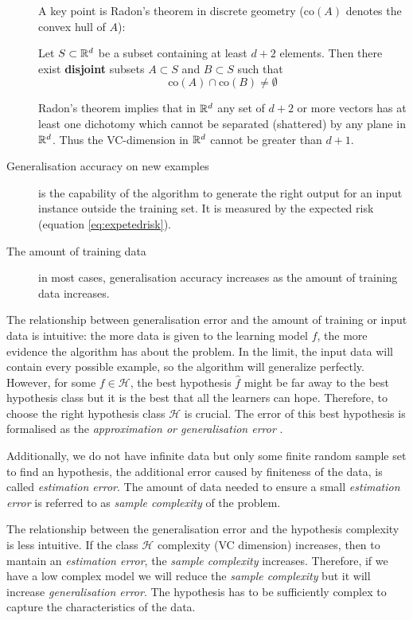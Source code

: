 \begin{description}
A key point is Radon's theorem in discrete geometry \cite{peterson1972geometry}
($\text{co}(A)$ denotes the convex hull of $A$):

\begin{theorem}[J. Radon]
Let $S\subset{\mathbb R }^d$ be a subset containing at least $d+2$ elements. 
Then there exist {\bf disjoint} subsets $A\subset S$ and $B\subset S$
such that
$$
\text{co}(A)\cap\text{co}(B)\neq\emptyset
$$
\end{theorem}

Radon's theorem implies that in ${\mathbb R }^d$ any set of $d+2$ or more vectors has at least one dichotomy which cannot be
separated (shattered) by any plane in ${\mathbb R }^d$. Thus the VC-dimension in ${\mathbb R }^d$ cannot be greater than $d+1$.



\item[Generalisation accuracy on new examples] is the capability of the
algorithm to generate the right output for an input instance outside the
training set. It is measured by the expected risk (equation \ref{eq:expetedrisk}).
\item[The amount of training data] in most cases, generalisation accuracy
increases as the amount of training data increases.
\end{description}


The relationship between generalisation error and the amount of training or
input data is intuitive: the more data is given to the learning model $f$, the
more evidence the algorithm has about the problem. In the limit, the input data
will contain every possible example, so the algorithm will generalize perfectly.
However, for some $f \in \mathscr{H}$, the best hypothesis $\hat{f}$ might be far away to
the best hypothesis class but it is the best that all the learners can hope.
Therefore, to choose the right hypothesis class $\mathscr{H}$ is crucial. The error of
this best hypothesis is formalised as the {\em approximation or generalisation
error} \cite{niyogi1996relationship}.

Additionally, we do not have infinite data but only some finite random sample
set to find an hypothesis, the additional error caused by finiteness of the
data, is called {\em estimation error}. The amount of data needed to ensure a
small {\em estimation error} is referred to as {\em sample complexity} of the
problem.

The relationship between the generalisation error and the hypothesis complexity
is less intuitive. If the class $\mathscr{H}$ complexity (VC dimension) increases, then to
mantain an {\em estimation error}, the {\em sample complexity} increases.
Therefore, if we have a low complex model we will reduce the {\em sample complexity}
but it will increase {\em generalisation error}. The hypothesis has to be
sufficiently complex to capture the characteristics of the data.

